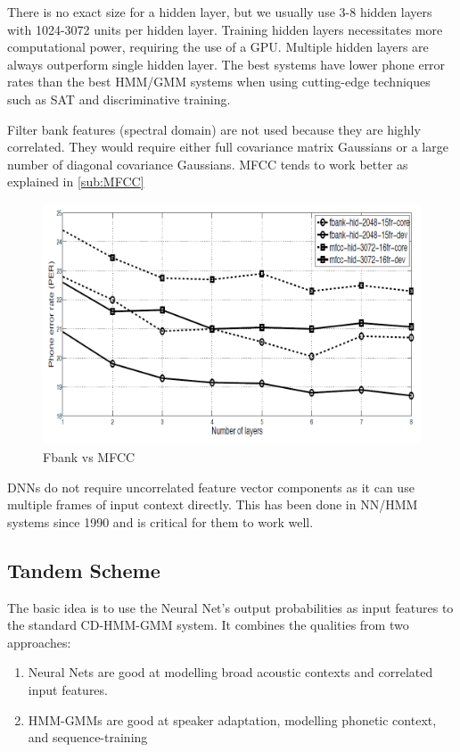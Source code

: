 There is no exact size for a hidden layer, but we usually use 3-8 hidden layers with 1024-3072 units per hidden layer. Training hidden layers necessitates more computational power, requiring the use of a GPU. Multiple hidden layers are always outperform single hidden layer. The best systems have lower phone error rates than the best HMM/GMM systems when using cutting-edge techniques such as SAT and discriminative training.

Filter bank features (spectral domain) are not used because they are highly correlated. They would require either full covariance matrix Gaussians or a large number of diagonal covariance Gaussians. MFCC tends to work better as explained in \ref{sub:MFCC}

\begin{figure}[h!]
    \centering
    \includegraphics[scale=0.4]{img/fbank vs mfcc.png}
    \caption{Fbank vs MFCC \cite{mohamed_understanding_2012}}
    \label{fig:mfcc-vs-fbank}
\end{figure}

DNNs do not require uncorrelated feature vector components as it can use multiple frames of input context directly. This has been done in NN/HMM systems since 1990 and is critical for them to work well.

\subsection{Tandem Scheme}
The basic idea is to use the Neural Net's output probabilities as input features to the standard CD-HMM-GMM system. It combines the qualities from two approaches: 
\begin{enumerate}
    \item Neural Nets are good at modelling broad acoustic contexts and correlated input features.
    \item HMM-GMMs are good at speaker adaptation, modelling phonetic context, and sequence-training
\end{enumerate}

